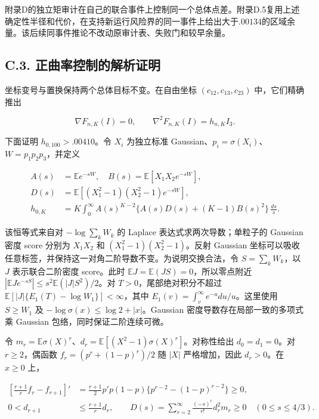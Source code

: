 \documentclass[11pt,a4paper]{article}
\begin{document}
附录D的独立矩审计在自己的联合事件上控制同一个总体点差。附录D.5复用上述确定性半径和代价，在支持新运行风险界的同一事件上给出大于\(.00134\)的区域余量。该后续同事件推论不改动原审计表、失败门和较早余量。

\subsection*{C.3.
正曲率控制的解析证明}\label{c.3.-ux6b63ux66f2ux7387ux63a7ux5236ux7684ux89e3ux6790ux8bc1ux660e}

坐标变号与置换保持两个总体目标不变。在自由坐标
\((c_{12},c_{13},c_{23})\) 中，它们精确推出

\[
\nabla F_{n,K}(I)=0,\qquad\nabla^2F_{n,K}(I)=h_{n,K}I_3.
\tag{C.8}
\]

下面证明 \(h_{0,100}>.00410\)。令 \(X_i\) 为独立标准
Gaussian、\(p_i=\sigma(X_i)\)、\(W=p_1p_2p_3\)，并定义

\[
\begin{aligned}
A(s)&=\mathbb E e^{-sW},\quad B(s)=\mathbb E[X_1X_2e^{-sW}],\\
D(s)&=\mathbb E[(X_1^2-1)(X_2^2-1)e^{-sW}],\\
h_{0,K}&=K\int_0^\infty A(s)^{K-2}\{A(s)D(s)+(K-1)B(s)^2\}\,\frac{ds}{s}.
\end{aligned}
\tag{C.9}
\]

该恒等式来自对 \(-\log\sum_kW_k\) 的 Laplace 表达式求两次导数；单粒子的
Gaussian 密度 score 分别为 \(X_1X_2\) 和 \((X_1^2-1)(X_2^2-1)\)。反射
Gaussian
坐标可以吸收任意标签，并保持这一对角二阶导数不变。为说明交换合法，令
\(S=\sum_kW_k\)，以 \(J\) 表示联合二阶密度 score。此时
\(\mathbb EJ=\mathbb E(JS)=0\)，所以零点附近
\(|\mathbb EJe^{-sS}|\le s^2\mathbb E(|J|S^2)/2\)。对
\(T>0\)，尾部绝对积分不超过
\(\mathbb E[|J|\{E_1(T)-\log W_1\}]<\infty\)，其中
\(E_1(v)=\int_v^\infty e^{-u}du/u\)。这里使用 \(S\ge W_1\) 及
\(-\log\sigma(x)\le\log2+|x|\)。Gaussian 密度导数存在局部一致的多项式乘
Gaussian 包络，同时保证二阶连续可微。

令
\(m_r=\mathbb E\sigma(X)^r\)、\(d_r=\mathbb E[(X^2-1)\sigma(X)^r]\)。对称性给出
\(d_0=d_1=0\)。对 \(r\ge2\)，偶函数 \(f_r=(p^r+(1-p)^r)/2\) 随 \(|X|\)
严格增加，因此 \(d_r>0\)。在 \(x\ge0\) 上，

\[
\begin{aligned}
\left[\frac{r+1}{r}f_r-f_{r+1}\right]'&=\frac{r+1}{2}p'p(1-p)\{p^{r-2}-(1-p)^{r-2}\}\ge0,\\
0<d_{r+1}&\le\frac{r+1}{r}d_r,\qquad
D(s)=\sum_{r=2}^\infty\frac{(-s)^r}{r!}d_r^2m_r\ge0\quad(0\le s\le4/3).
\end{aligned}
\tag{C.10}
\]
\end{document}
